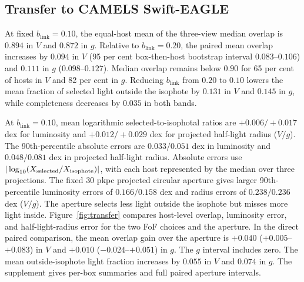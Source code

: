 \documentclass[usenatbib]{mnras}
\begin{document}
\subsection{Transfer to CAMELS Swift-EAGLE}
\label{sec:camelsresults}

At fixed $b_{\mathrm{link}}=0.10$, the equal-host mean of the three-view median overlap
is $0.894$ in $V$ and $0.872$ in $g$. Relative to $b_{\mathrm{link}}=0.20$, the paired
mean overlap increases by $0.094$ in $V$ (95 per cent box-then-host
bootstrap interval $0.083$--$0.106$) and $0.111$ in $g$
($0.098$--$0.127$). Median overlap remains below $0.90$ for 65 per cent
of hosts in $V$ and 82 per cent in $g$.
Reducing $b_{\mathrm{link}}$ from $0.20$ to $0.10$ lowers the mean fraction of selected
light outside the isophote by $0.131$ in $V$ and $0.145$ in $g$,
while completeness decreases by $0.035$ in both bands.

At $b_{\mathrm{link}}=0.10$, mean logarithmic selected-to-isophotal ratios are
$+0.006/+0.017$ dex for luminosity and $+0.012/+0.029$ dex for projected
half-light radius ($V/g$). The 90th-percentile absolute errors are
$0.033/0.051$ dex in luminosity and $0.048/0.081$ dex in projected
half-light radius.
Absolute errors use $|\log_{10}(X_{\rm selected}/X_{\rm isophote})|$,
with each host represented by the median over three projections.
The fixed 30 pkpc projected circular aperture gives larger
90th-percentile luminosity errors of $0.166/0.158$ dex and radius errors
of $0.238/0.236$ dex ($V/g$). The aperture selects less light outside
the isophote but misses more light inside. Figure~\ref{fig:transfer}
compares host-level overlap, luminosity error, and half-light-radius
error for the two FoF choices and the aperture. In the direct paired
comparison, the mean overlap gain over the aperture is $+0.040$
($+0.005$--$+0.083$) in $V$ and $+0.010$ ($-0.024$--$+0.051$) in $g$.
The $g$ interval includes zero. The mean outside-isophote light fraction
increases by $0.055$ in $V$ and $0.074$ in $g$. The supplement gives
per-box summaries and full paired aperture intervals.
\end{document}
